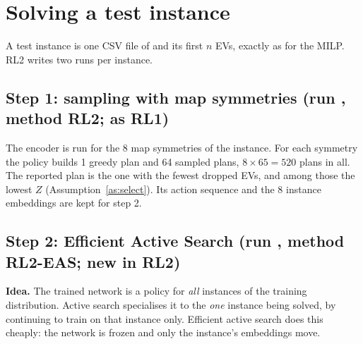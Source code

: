 \section{Solving a test instance}
\label{sec:inference}

A test instance is one CSV file of  and its first $n$ EVs, exactly as for the MILP. RL2 writes two runs per instance.

\subsection{Step 1: sampling with map symmetries (run , method RL2; as RL1)}

The encoder is run for the 8 map symmetries of the instance. For each symmetry the policy builds 1 greedy plan and 64 sampled plans, $8\times65=520$ plans in all. The reported plan is the one with the fewest dropped EVs, and among those the lowest $Z$ (Assumption~\ref{as:select}). Its action sequence and the 8 instance embeddings are kept for step 2.

\subsection{Step 2: Efficient Active Search (run , method RL2-EAS; new in RL2)}
\label{sec:eas}

\begin{keybox}
\textbf{Idea.} The trained network is a policy for \emph{all} instances of the training distribution. Active search specialises it to the \emph{one} instance being solved, by continuing to train on that instance only. Efficient active search does this cheaply: the network is frozen and only the instance's embeddings move.
\end{keybox}

